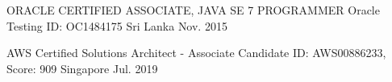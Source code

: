 

\begin{cvhonors}

  \cvhonor
    {ORACLE CERTIFIED ASSOCIATE, JAVA SE 7 PROGRAMMER} %
    {Oracle Testing ID: OC1484175} %
    {Sri Lanka} %
    {Nov. 2015} %

  \cvhonor
    {AWS Certified Solutions Architect - Associate} %
    {Candidate ID: AWS00886233, Score: 909} %
    {Singapore} %
    {Jul. 2019} %

\end{cvhonors}
